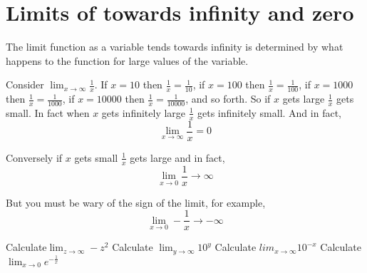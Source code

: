 \section*{Limits of towards infinity and zero}

The limit function as a variable tends towards infinity is determined by what happens to the function for large values of the variable.

Consider $\displaystyle{\lim_{x\to \infty} \frac{1}{x}}$. If $x=10$ then $\frac{1}{x}=\frac{1}{10}$, if $x=100$ then $\frac{1}{x}=\frac{1}{100}$, if $x=1000$ then $\frac{1}{x}=\frac{1}{1000}$, if $x=10000$ then $\frac{1}{x}=\frac{1}{10000}$, and so forth. So if $x$ gets large $\frac{1}{x}$ gets small. In fact when $x$ gets infinitely large $\frac{1}{x}$ gets infinitely small. And in fact, $$\lim_{x\to\infty} \frac{1}{x}=0$$

Conversely if $x$ gets small $\frac{1}{x}$ gets large and in fact,
$$\lim_{x\to 0} \frac{1}{x}\to\infty$$

But you must be wary of the sign of the limit, for example,
$$\lim_{x\to 0} -\frac{1}{x}\to-\infty$$

\begin{questions}
\question Calculate$\displaystyle{\lim_{z\to \infty} -z^2}$
\vspace{2in}
\question
Calculate $\displaystyle{\lim_{y\to \infty} 10^y}$
\vspace{2in}
\question
Calculate $\displaystyle{lim_{x\to \infty} 10^{-x}}$
\vspace{2in}
Calculate $\displaystyle{\lim_{x\to 0} e^{-{\frac{1}{x}}}}$
\end{questions}
